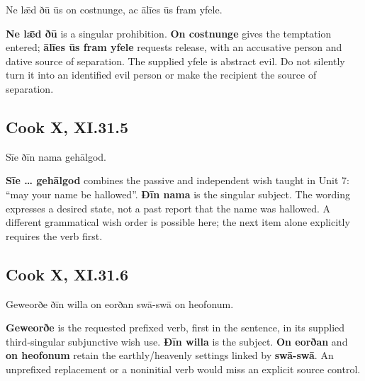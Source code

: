 \par\begin{minipage}{\linewidth}\raggedright
Ne lǣd ðū ūs on costnunge, ac ālīes ūs fram yfele.

\textbf{Ne lǣd ðū} is a singular prohibition. \textbf{On costnunge} gives the temptation entered; \textbf{ālīes ūs fram yfele} requests release, with an accusative person and dative source of separation. The supplied yfele is abstract evil. Do not silently turn it into an identified evil person or make the recipient the source of separation.

\end{minipage}\par\addvspace{4pt}

\subsection*{Cook X, XI.31.5}

\par\begin{minipage}{\linewidth}\raggedright
Sīe ðīn nama gehālgod.

\textbf{Sīe … gehālgod} combines the passive and independent wish taught in Unit 7: “may your name be hallowed”. \textbf{Ðīn nama} is the singular subject. The wording expresses a desired state, not a past report that the name was hallowed. A different grammatical wish order is possible here; the next item alone explicitly requires the verb first.

\end{minipage}\par\addvspace{4pt}

\subsection*{Cook X, XI.31.6}

\par\begin{minipage}{\linewidth}\raggedright
Geweorðe ðīn willa on eorðan swā-swā on heofonum.

\textbf{Geweorðe} is the requested prefixed verb, first in the sentence, in its supplied third-singular subjunctive wish use. \textbf{Ðīn willa} is the subject. \textbf{On eorðan} and \textbf{on heofonum} retain the earthly/\allowbreak{}heavenly settings linked by \textbf{swā-swā}. An unprefixed replacement or a noninitial verb would miss an explicit source control.

\end{minipage}\par\addvspace{4pt}

